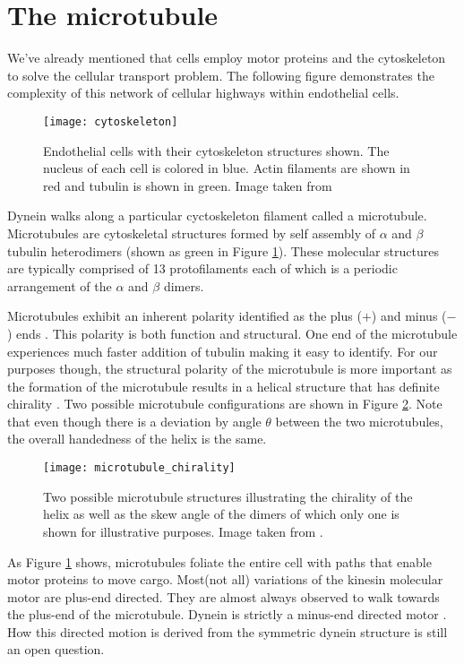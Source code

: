 \section{The microtubule}
We've already mentioned that cells employ motor proteins and the cytoskeleton to solve the cellular transport problem. The following figure demonstrates the complexity of this network of cellular highways within endothelial cells. 
\begin{figure}[!hbt]
	\centering
	\texttt{[image: cytoskeleton]}
	\caption{Endothelial cells with their cytoskeleton structures shown. The nucleus of each cell is colored in blue. Actin filaments are shown in red and tubulin is shown in green. Image taken from \cite{cytoskeleton}}
	\label{fig:cytoskeleton}
\end{figure}

Dynein walks along a particular cyctoskeleton filament called a microtubule. Microtubules are cytoskeletal structures formed by self assembly of $\alpha$ and $\beta$ tubulin heterodimers (shown as green in Figure \ref{fig:cytoskeleton}). \cite{downing1998tubulin} These molecular structures are typically comprised of 13 protofilaments each of which is a periodic arrangement of the $\alpha$ and $\beta$ dimers. 

Microtubules exhibit an inherent polarity identified as the plus ($+$) and minus ($-$) ends \cite{berk2000molecular}. This polarity is both function and structural. One end of the microtubule experiences much faster addition of tubulin making it easy to identify\cite{heidemann1980visualization}. For our purposes though, the structural polarity of the microtubule is more important as the formation of the microtubule results in a helical structure that has definite chirality \cite{hunyadi2007microtubule}. Two possible microtubule configurations are shown in Figure \ref{fig:chirality}. Note that even though there is a deviation by angle $\theta$ between the two microtubules, the overall handedness of the helix is the same. 

\begin{figure}[!hbt]
	\centering 
	\texttt{[image: microtubule\_chirality]}
	\caption{Two possible microtubule structures illustrating the chirality of the helix as well as the skew angle of the dimers of which only one is shown for illustrative purposes. Image taken from \cite{microtubule_chirality}.}
	\label{fig:chirality}
\end{figure}

As Figure \ref{fig:cytoskeleton} shows, microtubules foliate the entire cell with paths that enable motor proteins to move cargo. Most(not all) variations of the kinesin molecular motor are plus-end directed. They are almost always observed to walk towards the plus-end of the microtubule. Dynein is strictly a minus-end directed motor \cite{alberts2002molecular}. How this directed motion is derived from the symmetric dynein structure is still an open question.\\



